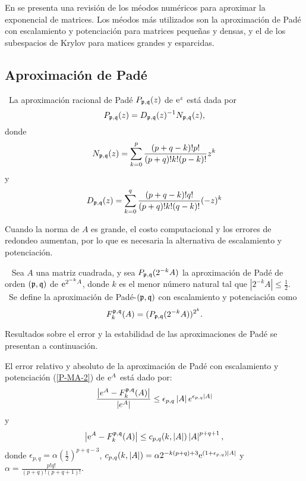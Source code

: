En \cite{golub2013matrix} se presenta una revisión de los méodos numéricos
para aproximar
la exponencial de matrices. Los méodos más utilizados son la aproximación de Padé con escalamiento
y potenciación para matrices pequeñas y densas, y el de los subespacios de Krylov para matices grandes y esparcidas.


\subsection{Aproximación de Padé}

\begin{definition}
    \cite{golub2013matrix}~La aproximación racional de Padé $P_{\mathfrak{p},\mathfrak{q}}(z)$
    de $\mathrm{e}^{z}$ est\'{a} dada por 
    \begin{equation*}
    P_{\mathfrak{p},\mathfrak{q}}(z)=D_{\mathfrak{p},\mathfrak{q}}(z)^{-1}N_{\mathfrak{p},\mathfrak{q}}(z),  \label{FORM PADE}
    \end{equation*}%
    donde 
    \[
    N_{\mathfrak{p},\mathfrak{q}}(z)=\sum\limits_{k=0}^p\frac{(p+q-k)!p!}{(p+q)!k!(p-k)!}z^k
    \]%
    y 
    \[
    D_{\mathfrak{p},\mathfrak{q}}(z)=\sum\limits_{k=0}^q\frac{(p+q-k)!q!}{(p+q)!k!(q-k)!}(-z)^k
    \]
\end{definition}

Cuando la norma de $A$ es grande, el costo computacional  y los errores de redondeo aumentan, por lo que
es necesaria la alternativa de escalamiento y potenciación.

\begin{definition}\cite{golub2013matrix}~
    Sea $A$ una matriz cuadrada, y sea $P_{\pf,\qf}(2^{-k}A%
    )$ la aproximación de Padé de orden $(\mathfrak{p},\mathfrak{q})\ $de $\me{2^{-k}A%
    }$, donde $k$ es el menor número natural tal que $\left\vert 2^{-k}A%
    \right\vert \leq \frac{1}{2}$. \ Se define la aproximación de  Padé-$(\mathfrak{p},\mathfrak{q})$ con escalamiento y potenciación como 
    \begin{equation}
    F_{k}^{\mathfrak{p},\mathfrak{q}}(A)=(P_{\mathfrak{p},\mathfrak{q}}(2^{-k}A))^{2^{k}}.
    \label{P-MA-2}
    \end{equation}
\end{definition}

Resultados sobre el error y la estabilidad de las aproximaciones de Padé se presentan a continuación.

\begin{theorem}
    \label{Conv. Pade}\cite{jimenez2012convergence} El error
    relativo y absoluto de la aproximación de Padé con escalamiento y
    potenciación (\ref{P-MA-2}) de $\mathrm{e}^{A}$ est\'{a} dado por: 
    \[
    \frac{\left\vert e^{A}-F_{k}^{\mathfrak{p},\mathfrak{q}}(A)\right\vert 
    }{\left\vert e^{A}\right\vert }\leq \epsilon _{p,q}\left\vert 
    A\right\vert e^{\epsilon _{p,q}\left\vert A\right\vert }
    \]%
    y 
    \begin{equation}
    \left\vert \mathrm{e}^{A}-F_{k}^{\mathfrak{p},\mathfrak{q}}(A)\right\vert \leq
    c_{p,q}(k,\left\vert A\right\vert )\left\vert A\right\vert
    ^{p+q+1}, \label{errpade}
    \end{equation}
    donde $\epsilon _{p,q}=\alpha (\frac{1}{2})^{p+q-3}$, $%
    c_{p,q}(k,\left\vert A\right\vert )=\alpha
    2^{-k(p+q)+3}\me{(1+\epsilon _{p,q})\left\vert A\right\vert }$ y $%
    \alpha =\frac{p!q!}{(p+q)!(p+q+1)!}$.
\end{theorem}

